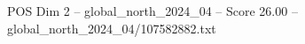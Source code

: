 \begin{textsample}{POS Dim 2 – global\_north\_2024\_04 – Score 26.00 – global\_north\_2024\_04/107582882.txt}
\end{textsample}
